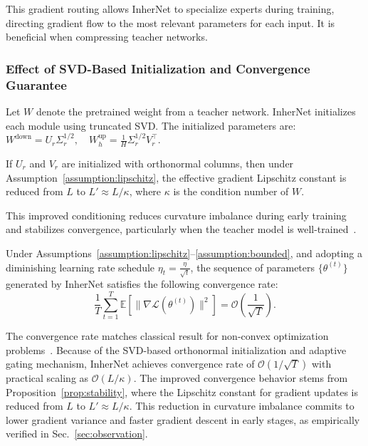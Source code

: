 \documentclass{article} %
\begin{document}
This gradient routing allows InherNet to specialize experts during training, directing gradient flow to the most relevant parameters for each input. It is beneficial when compressing teacher networks.

\subsubsection{Effect of SVD-Based Initialization and Convergence Guarantee}

Let $W$ denote the pretrained weight from a teacher network. InherNet initializes each module using truncated SVD. The initialized parameters are: \(W^{\text{down}} = U_r \Sigma_r^{1/2}, \quad W^{\text{up}}_h = \frac{1}{H} \Sigma_r^{1/2} V_r^\top.\)

\begin{proposition}
\label{prop:stability}
If $U_r$ and $V_r$ are initialized with orthonormal columns, then under Assumption~\ref{assumption:lipschitz}, the effective gradient Lipschitz constant is reduced from $L$ to $L' \approx L / \kappa$, where $\kappa$ is the condition number of $W$.
\end{proposition}

This improved conditioning reduces curvature imbalance during early training and stabilizes convergence, particularly when the teacher model is well-trained~\citep{wang2024model, lim2024simple, saxe2013exact}.


\begin{theorem}
\label{thm:convergence}
Under Assumptions~\ref{assumption:lipschitz}--\ref{assumption:bounded}, and adopting a diminishing learning rate schedule $\eta_t = \frac{\eta}{\sqrt{t}}$, the sequence of parameters $\{\theta^{(t)}\}$ generated by InherNet satisfies the following convergence rate:
\begin{equation}
    \frac{1}{T}\sum_{t=1}^{T}\mathbb{E}\left[\|\nabla\mathcal{L}(\theta^{(t)})\|^2\right]=\mathcal{O}\left(\frac{1}{\sqrt{T}}\right).
\end{equation}
\end{theorem}


The convergence rate matches classical result for non-convex optimization problems~\citep{xu2024psmgd}. Because of the SVD-based orthonormal initialization and adaptive gating mechanism, InherNet achieves convergence rate of $\mathcal{O}(1/\sqrt{T})$ with practical scaling as $\mathcal{O}(L/\kappa)$. The improved convergence behavior stems from Proposition~\ref{prop:stability}, where the Lipschitz constant for gradient updates is reduced from $L$ to $L' \approx L/\kappa$. This reduction in curvature imbalance commits to lower gradient variance and faster gradient descent in early stages, as empirically verified in Sec.~\ref{sec:observation}.
\end{document}
